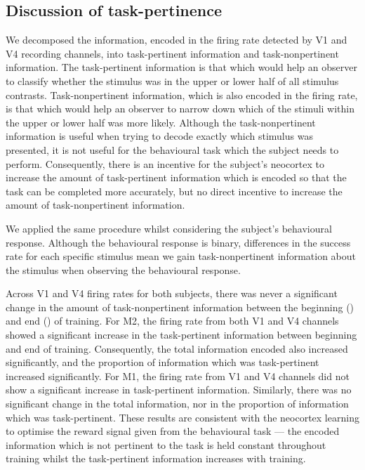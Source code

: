 \subsection{Discussion of task-pertinence}

We decomposed the information, encoded in the firing rate detected by \ac{V1} and \ac{V4} recording channels, into task-pertinent information and task-nonpertinent information.
The task-pertinent information is that which would help an observer to classify whether the stimulus was in the upper or lower half of all stimulus contrasts.
Task-nonpertinent information, which is also encoded in the firing rate, is that which would help an observer to narrow down which of the stimuli within the upper or lower half was more likely.
Although the task-nonpertinent information is useful when trying to decode exactly which stimulus was presented, it is not useful for the behavioural task which the subject needs to perform.
Consequently, there is an incentive for the subject's neocortex to increase the amount of task-pertinent information which is encoded so that the task can be completed more accurately, but no direct incentive to increase the amount of task-nonpertinent information.

We applied the same procedure whilst considering the subject's behavioural response.
Although the behavioural response is binary, differences in the success rate for each specific stimulus mean we gain task-nonpertinent information about the stimulus when observing the behavioural response.

Across \ac{V1} and \ac{V4} firing rates for both subjects, there was never a significant change in the amount of task-nonpertinent information between the beginning () and end () of training.
For \ac{M2}, the firing rate from both \ac{V1} and \ac{V4} channels showed a significant increase in the task-pertinent information between beginning and end of training.
Consequently, the total information encoded also increased significantly, and the proportion of information which was task-pertinent increased significantly.
For \ac{M1}, the firing rate from \ac{V1} and \ac{V4} channels did not show a significant increase in task-pertinent information.
Similarly, there was no significant change in the total information, nor in the proportion of information which was task-pertinent.
These results are consistent with the neocortex learning to optimise the reward signal given from the behavioural task --- the encoded information which is not pertinent to the task is held constant throughout training whilst the task-pertinent information increases with training.


